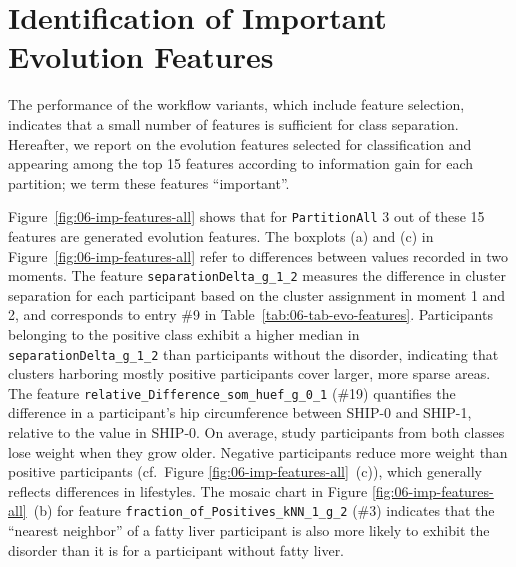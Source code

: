 \documentclass[
  oneside]{book}
\begin{document}
\hypertarget{evo-important-features}{%
\section{Identification of Important Evolution Features}\label{evo-important-features}}

The performance of the workflow variants, which include feature selection, indicates that a small number of features is sufficient for class separation.
Hereafter, we report on the evolution features selected for classification and appearing among the top 15 features according to information gain for each partition; we term these features ``important''.

Figure~\ref{fig:06-imp-features-all} shows that for \texttt{PartitionAll} 3 out of these 15 features are generated evolution features.
The boxplots (a) and (c) in Figure~\ref{fig:06-imp-features-all} refer to differences between values recorded in two moments.
The feature \texttt{separationDelta\_g\_1\_2} measures the difference in cluster separation for each participant based on the cluster assignment in moment 1 and 2, and corresponds to entry \#9 in Table~\ref{tab:06-tab-evo-features}.
Participants belonging to the positive class exhibit a higher median in \texttt{separationDelta\_g\_1\_2} than participants without the disorder, indicating that clusters harboring mostly positive participants cover larger, more sparse areas.
The feature \texttt{relative\_Difference\_som\_huef\_g\_0\_1} (\#19) quantifies the difference in a participant's hip circumference between SHIP-0 and SHIP-1, relative to the value in SHIP-0.
On average, study participants from both classes lose weight when they grow older. Negative participants reduce more weight than positive participants (cf.~Figure \ref{fig:06-imp-features-all}~(c)), which generally reflects differences in lifestyles.
The mosaic chart in Figure \ref{fig:06-imp-features-all}~(b) for feature \texttt{fraction\_of\_Positives\_kNN\_1\_g\_2} (\#3) indicates that the ``nearest neighbor'' of a fatty liver participant is also more likely to exhibit the disorder than it is for a participant without fatty liver.
\end{document}
